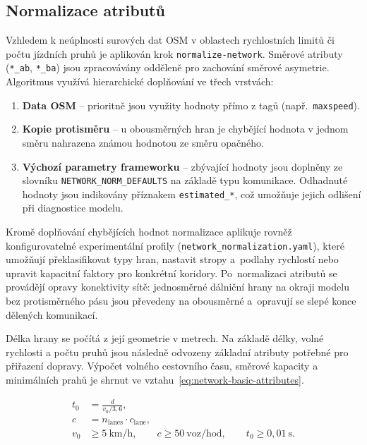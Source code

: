 \subsection{Normalizace atributů}
\label{sec:impl-network-norm}

Vzhledem k neúplnosti surových dat OSM v oblastech rychlostních limitů či počtu jízdních pruhů je aplikován krok \texttt{normalize-network}. Směrové atributy (\texttt{*\_ab}, \texttt{*\_ba}) jsou zpracovávány odděleně pro zachování směrové asymetrie. Algoritmus využívá hierarchické doplňování ve třech vrstvách:

\begin{enumerate}
  \item \textbf{Data OSM} -- prioritně jsou využity hodnoty přímo z tagů (např.\ \texttt{maxspeed}).
  \item \textbf{Kopie protisměru} -- u obousměrných hran je chybějící hodnota v jednom směru nahrazena známou hodnotou ze směru opačného.
  \item \textbf{Výchozí parametry frameworku} -- zbývající hodnoty jsou doplněny ze slovníku \texttt{NETWORK\_NORM\_DEFAULTS} na základě typu komunikace. Odhadnuté hodnoty jsou indikovány příznakem \texttt{estimated\_*}, což umožňuje jejich odlišení při diagnostice modelu.
\end{enumerate}

Kromě doplňování chybějících hodnot normalizace aplikuje rovněž konfigurovatelné experimentální profily (\texttt{network\_normalization.yaml}), které umožňují překlasifikovat typy hran, nastavit stropy a~podlahy rychlostí nebo upravit kapacitní faktory pro konkrétní koridory. Po~normalizaci atributů se provádějí opravy konektivity sítě: jednosměrné dálniční hrany na okraji modelu bez protisměrného pásu jsou převedeny na obousměrné a~opravují se slepé konce dělených komunikací.

Délka hrany se počítá z její geometrie v metrech. Na základě délky, volné rychlosti a počtu pruhů jsou následně odvozeny základní atributy potřebné pro přiřazení dopravy. Výpočet volného cestovního času, směrové kapacity a minimálních prahů je shrnut ve vztahu~\ref{eq:network-basic-attributes}.

\begin{equation}
\begin{aligned}
t_0 &= \frac{d}{v_0 / 3{,}6}, \\
c &= n_{\mathrm{lanes}} \cdot c_{\mathrm{lane}}, \\
v_0 &\geq 5~\mathrm{km/h}, \qquad
c \geq 50~\mathrm{voz/hod}, \qquad
t_0 \geq 0{,}01~\mathrm{s}.
\end{aligned}
\label{eq:network-basic-attributes}
\end{equation}

